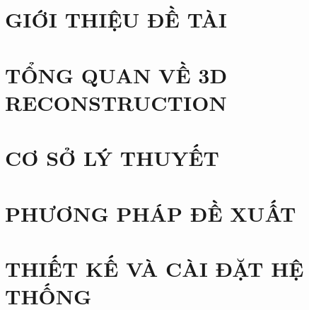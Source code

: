 \documentclass[a4paper,twoside]{report}
\theoremstyle{definition}
\begin{document}
\renewcommand{\listtablename}{DANH MỤC BẢNG BIỂU}
{\let\oldnumberline\numberline
\renewcommand{\numberline}{Bảng~\oldnumberline}
\listoftables}

\glsaddall 
\renewcommand*{\acronymname}{DANH MỤC THUẬT NGỮ VÀ TỪ VIẾT TẮT}
\renewcommand*{\entryname}{Thuật ngữ}
\renewcommand*{\descriptionname}{Ý nghĩa}
\printnoidxglossary[type=\acronymtype]

\renewcommand\appendixname{PHỤ LỤC}
\renewcommand\appendixpagename{PHỤ LỤC}
\renewcommand\appendixtocname{PHỤ LỤC}





\newpage
{}

\pagestyle{fancy}
\fancyhf{}
\fancyhead[RE, LO]{\leftmark}
\fancyfoot[RE, LO]{\thepage}

\chapter{GIỚI THIỆU ĐỀ TÀI}

\newpage
\chapter{TỔNG QUAN VỀ 3D RECONSTRUCTION}



\newpage
\chapter{CƠ SỞ LÝ THUYẾT}


\newpage
\chapter{PHƯƠNG PHÁP ĐỀ XUẤT}


\newpage
\chapter{THIẾT KẾ VÀ CÀI ĐẶT HỆ THỐNG}

\end{document}
